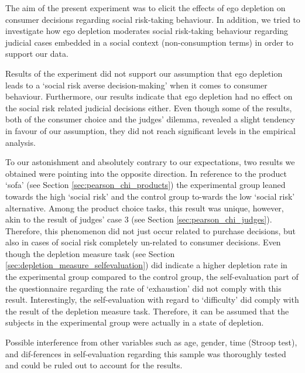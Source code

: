 The aim of the present experiment was to elicit the effects of ego depletion on consumer decisions regarding social risk-taking behaviour. In addition, we tried to investigate how ego depletion moderates social risk-taking behaviour regarding judicial cases embedded in a social context (non-consumption terms) in order to support our data. \par
Results of the experiment did not support our assumption that ego depletion leads to a ‘social risk averse decision-making’ when it comes to consumer behaviour. Furthermore, our results indicate that ego depletion had no effect on the social risk related judicial decisions either. Even though some of the results, both of the consumer choice and the judges’ dilemma, revealed a slight tendency in favour of our assumption, they did not reach significant levels in the empirical analysis. \par
To our astonishment and absolutely contrary to our expectations, two results we obtained were pointing into the opposite direction. In reference to the product ‘sofa’ (see Section \ref{sec:pearson_chi_products}) the experimental group leaned towards the high ‘social risk’ and the control group to-wards the low ‘social risk’ alternative. Among the product choice tasks, this result was unique, however, akin to the result of judges’ case 3 (see Section \ref{sec:pearson_chi_judges}). Therefore, this phenomenon did not just occur related to purchase decisions, but also in cases of social risk completely un-related to consumer decisions. Even though the depletion measure task (see Section \ref{sec:depletion_measure_selfevaluation}) did indicate a higher depletion rate in the experimental group compared to the control group, the self-evaluation part of the questionnaire regarding the rate of ‘exhaustion’ did not comply with this result. Interestingly, the self-evaluation with regard to ‘difficulty’ did comply with the result of the depletion measure task. Therefore, it can be assumed that the subjects in the experimental group were actually in a state of depletion.\par
Possible interference from other variables such as age, gender, time (Stroop test), and dif-ferences in self-evaluation regarding this sample was thoroughly tested and could be ruled out to account for the results. \par
